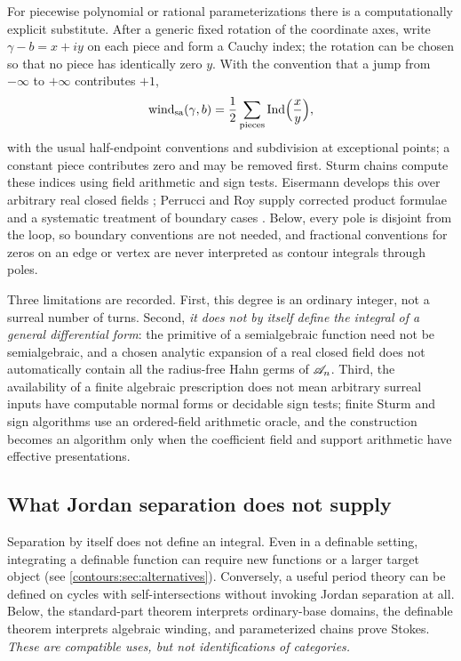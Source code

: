 \documentclass[11pt,letterpaper]{article}
\theoremstyle{definition}
\theoremstyle{remark}
\numberwithin{equation}{section}
\begin{document}
For piecewise polynomial or rational parameterizations there is a computationally
explicit substitute. After a generic fixed rotation of the coordinate axes, write
$\gamma-b=x+iy$ on each piece and form a Cauchy index; the rotation can be chosen
so that no piece has identically zero $y$. With the convention that a jump from
$-\infty$ to $+\infty$ contributes $+1$,
\begin{equation}\label{contours:eq:cauchyindex}
  \operatorname{wind}_{\mathrm{sa}}(\gamma,b)
  =\frac12\sum_{\text{pieces}}\operatorname{Ind}\Bigl(\frac{x}{y}\Bigr),
\end{equation}
with the usual half-endpoint conventions and subdivision at exceptional points; a
constant piece contributes zero and may be removed first. Sturm chains compute
these indices using field arithmetic and sign tests. Eisermann develops this over
arbitrary real closed fields \cite{Eisermann}; Perrucci and Roy supply corrected
product formulae and a systematic treatment of boundary cases \cite{PR}. Below,
every pole is disjoint from the loop, so boundary conventions are not needed, and
fractional conventions for zeros on an edge or vertex are never interpreted as
contour integrals through poles.

Three limitations are recorded. First, this degree is an ordinary integer, not a
surreal number of turns. Second, \emph{it does not by itself define the integral of
a general differential form}: the primitive of a semialgebraic function need not be
semialgebraic, and a chosen analytic expansion of a real closed field does not
automatically contain all the radius-free Hahn germs of $\mathscr A_n$. Third, the
availability of a finite algebraic prescription does not mean arbitrary surreal
inputs have computable normal forms or decidable sign tests; finite Sturm and sign
algorithms use an ordered-field arithmetic oracle, and the construction becomes an
algorithm only when the coefficient field and support arithmetic have effective
presentations.

\subsection{What Jordan separation does not supply}
Separation by itself does not define an integral. Even in a definable setting,
integrating a definable function can require new functions or a larger target
object (see \cref{contours:sec:alternatives}). Conversely, a useful period theory
can be defined on cycles with self-intersections without invoking Jordan separation
at all. Below, the standard-part theorem interprets ordinary-base domains, the
definable theorem interprets algebraic winding, and parameterized chains prove
Stokes. \emph{These are compatible uses, but not identifications of categories.}
\end{document}
